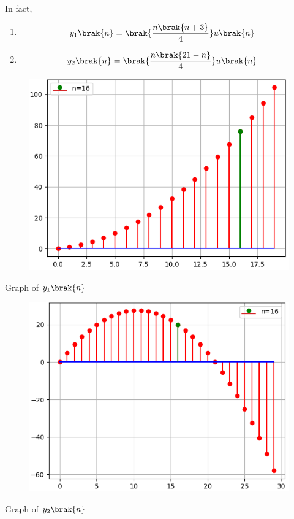 \documentclass[journal,12pt,twocolumn]{IEEEtran}
\theoremstyle{remark}
\begin{document}
In fact,\\
    \begin{enumerate}
    \item
    \begin{align}
        y_1\brak{n}&=\brak{\frac{n\brak{n+3}}{4}}u\brak{n}
    \end{align}
    \item
    \begin{align}
        y_2\brak{n}&=\brak{\frac{n\brak{21-n}}{4}}u\brak{n}
    \end{align}
\end{enumerate}
\begin{figure}[h]
    \centering
    \includegraphics[scale=0.60]{ncert-maths/10/5/4/2/figs/py_4.png}
    \label{fig:s1n}
\end{figure}
\begin{center}
    Graph of $y_1\brak{n}$\\[30ex]
\end{center}
\begin{figure}[h]
    \centering
    \includegraphics[scale=0.60]{ncert-maths/10/5/4/2/figs/py_6.png}
    \label{s2n}
\end{figure}
\begin{center}
Graph of $y_2\brak{n}$
\end{center}
\end{document}

